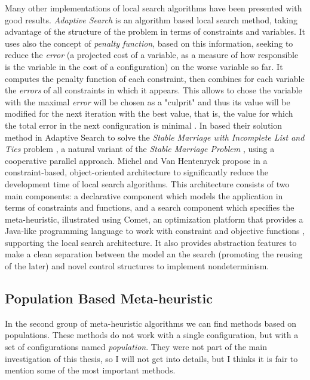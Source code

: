 Many other implementations of local search algorithms have been presented with good results. {\it Adaptive Search} is an algorithm based local search method, taking advantage of the structure of the problem in terms of constraints and variables. It uses also the concept of \textit{penalty function}, based on this information, seeking to reduce the \textit{error} (a projected cost of a variable, as a measure of how responsible is the variable in the cost of a configuration) on the worse variable so far. It computes the penalty function of each constraint, then combines for each variable the \textit{errors} of all constraints in which it appears. This allows to chose the variable with the maximal \textit{error} will be chosen as a "culprit" and thus its value will be modified for the next iteration with the best value, that is, the value for which the total error in the next configuration is minimal \cite{Diaz, Codognet2001, Caniou14}. In \cite{Munera2015}  based their solution method in Adaptive Search to solve the \textit{Stable Marriage with Incomplete List and Ties} problem \cite{Iwama1999}, a natural variant of the \textit{Stable Marriage Problem} \cite{Gale1962}, using a cooperative parallel approach. Michel and Van Hentenryck propose in \cite{Michel2002} a constraint-based, object-oriented architecture to significantly reduce the development time of local search algorithms. This architecture consists of two main components: a declarative component which models the application in terms of constraints and functions, and a search component which specifies the meta-heuristic, illustrated using {\sc Comet}, an optimization platform that provides a Java-like programming language to work with constraint and objective functions \cite{Comet, Michel2005}, supporting the local search architecture. It also provides abstraction features to make a clean separation between the model an the search (promoting the reusing of the later) and novel control structures to implement nondeterminism.

\subsection{Population Based Meta-heuristic}

In the second group of meta-heuristic algorithms we can find methods based on populations. These methods do not work with a single configuration, but with a set of configurations named {\it population}. They were not part of the main investigation of this thesis, so I will not get into details, but I thinks it is fair to mention some of the most important methods.

